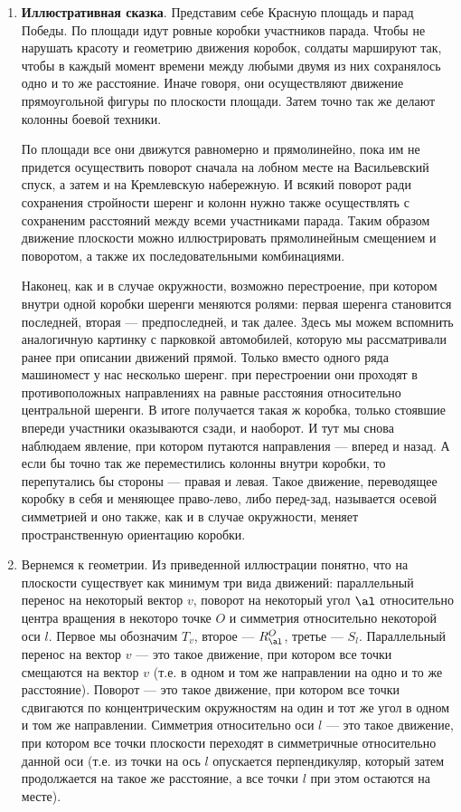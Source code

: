 \begin{enumerate}
\item \textbf{Иллюстративная сказка}. Представим себе Красную площадь и парад Победы. По площади идут ровные коробки участников парада. Чтобы не нарушать красоту и геометрию движения коробок, солдаты маршируют так, чтобы в каждый момент времени между любыми двумя из них сохранялось одно и то же расстояние. Иначе говоря, они осуществляют движение прямоугольной фигуры по плоскости площади. Затем точно так же делают колонны боевой техники.

По площади все они движутся равномерно и прямолинейно, пока им не придется осуществить поворот сначала на лобном месте на Васильевский спуск, а затем и на Кремлевскую набережную. И всякий поворот ради сохранения стройности шеренг и колонн нужно также осуществлять с сохраненим расстояний между всеми участниками парада. Таким образом движение плоскости можно иллюстрировать прямолинейным смещением и поворотом, а также их последовательными комбинациями.

Наконец, как и в случае окружности, возможно перестроение, при котором внутри одной коробки шеренги меняются ролями: первая шеренга становится последней, вторая --- предпоследней, и так далее. Здесь мы можем вспомнить аналогичную картинку с парковкой автомобилей, которую мы рассматривали ранее при описании движений прямой. Только вместо одного ряда машиномест у нас несколько шеренг. при перестроении они проходят в противоположных направлениях на равные расстояния относительно центральной шеренги. В итоге получается такая ж коробка, только стоявшие впереди участники оказываются сзади, и наоборот. И тут мы снова наблюдаем явление, при котором путаются направления --- вперед и назад. А если бы точно так же переместились колонны внутри коробки, то перепутались бы стороны --- правая и левая. Такое движение, переводящее коробку в себя и меняющее право-лево, либо перед-зад, называется осевой симметрией и оно также, как и в случае окружности, меняет пространственную ориентацию коробки.

\item Вернемся к геометрии.
Из приведенной иллюстрации понятно, что на плоскости существует как минимум три вида движений: параллельный перенос на некоторый вектор $v$, поворот на некоторый угол $\al$ относительно центра вращения в некоторо точке $O$ и симметрия относительно некоторой оси $l$. Первое мы обозначим $T_v$, второе --- $R^O_\al$, третье --- $S_l$. Параллельный перенос на вектор $v$ --- это такое движение, при котором все точки смещаются на вектор $v$ (т.е. в одном и том же направлении на одно и то же расстояние). Поворот --- это такое движение, при котором все точки сдвигаются по концентрическим окружностям на один и тот же угол в одном и том же направлении. Симметрия относительно оси $l$ --- это такое движение, при котором все точки плоскости переходят в симметричные относительно данной оси (т.е. из точки на ось $l$ опускается перпендикуляр, который затем продолжается на такое же расстояние, а все точки $l$ при этом остаются на месте).


\end{enumerate}
